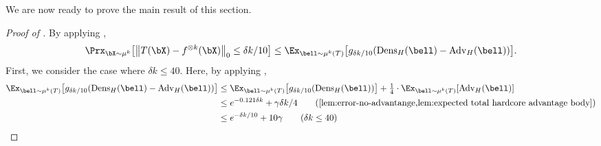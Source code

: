 \documentclass[11pt]{article}
\newcommand{\Dens}{\mathrm{Dens}}
\newcommand{\Adv}{\mathrm{Adv}}
\DeclarePairedDelimiter\lzero{\|}{\|_0}
\DeclarePairedDelimiter\bracket{[}{]}
\begin{document}
We are now ready to prove the main result of this section.
\begin{proof}[Proof of ]
    By applying ,
    \begin{equation*}
        \Prx_{\bX \sim \mu^k}\bracket*{\lzero[\big]{T(\bX)-f^{\otimes k}(\bX)} \leq \delta k/10} \leq \Ex_{\bell \sim \mu^k(T)}\bracket*{g_{\delta k/10}(\Dens_H(\bell) - \Adv_H(\bell))}.
    \end{equation*}
    First, we consider the case where $\delta k \leq 40$. Here, by applying ,
    \begin{align*}
        \Ex_{\bell \sim \mu^k(T)}\bracket*{g_{\delta k/10}(\Dens_H(\bell) - \Adv_H(\bell))} &\leq \Ex_{\bell \sim \mu^k(T)}\bracket*{g_{\delta k/10}(\Dens_H(\bell))} + \tfrac{1}{4}\cdot \Ex_{\bell \sim \mu^k(T)}[\Adv_H(\bell)]\\
        &\leq e^{-0.121 \delta k} + \gamma \delta k/4 \tag{\Cref{lem:error-no-advantange,lem:expected total hardcore advantage body}}\\
        &\leq e^{-\delta k/10} + 10\gamma\tag{$\delta k \leq 40$}
    \end{align*}


\end{proof}
\end{document}

